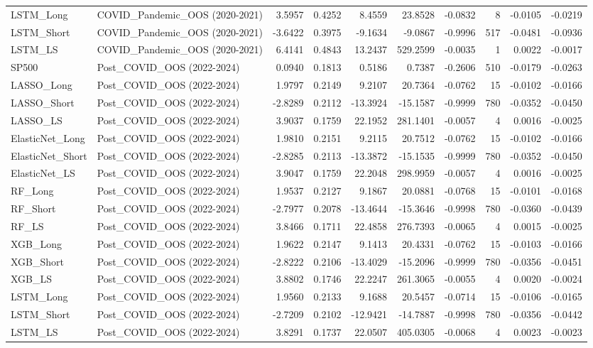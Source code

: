 \begin{tabular}{llrrrrrrrr}
\cline{1-10}
LSTM\_Long & COVID\_Pandemic\_OOS (2020-2021) & 3.5957 & 0.4252 & 8.4559 & 23.8528 & -0.0832 & 8 & -0.0105 & -0.0219 \\
\cline{1-10}
LSTM\_Short & COVID\_Pandemic\_OOS (2020-2021) & -3.6422 & 0.3975 & -9.1634 & -9.0867 & -0.9996 & 517 & -0.0481 & -0.0936 \\
\cline{1-10}
LSTM\_LS & COVID\_Pandemic\_OOS (2020-2021) & 6.4141 & 0.4843 & 13.2437 & 529.2599 & -0.0035 & 1 & 0.0022 & -0.0017 \\
\cline{1-10}
SP500 & Post\_COVID\_OOS (2022-2024) & 0.0940 & 0.1813 & 0.5186 & 0.7387 & -0.2606 & 510 & -0.0179 & -0.0263 \\
\cline{1-10}
LASSO\_Long & Post\_COVID\_OOS (2022-2024) & 1.9797 & 0.2149 & 9.2107 & 20.7364 & -0.0762 & 15 & -0.0102 & -0.0166 \\
\cline{1-10}
LASSO\_Short & Post\_COVID\_OOS (2022-2024) & -2.8289 & 0.2112 & -13.3924 & -15.1587 & -0.9999 & 780 & -0.0352 & -0.0450 \\
\cline{1-10}
LASSO\_LS & Post\_COVID\_OOS (2022-2024) & 3.9037 & 0.1759 & 22.1952 & 281.1401 & -0.0057 & 4 & 0.0016 & -0.0025 \\
\cline{1-10}
ElasticNet\_Long & Post\_COVID\_OOS (2022-2024) & 1.9810 & 0.2151 & 9.2115 & 20.7512 & -0.0762 & 15 & -0.0102 & -0.0166 \\
\cline{1-10}
ElasticNet\_Short & Post\_COVID\_OOS (2022-2024) & -2.8285 & 0.2113 & -13.3872 & -15.1535 & -0.9999 & 780 & -0.0352 & -0.0450 \\
\cline{1-10}
ElasticNet\_LS & Post\_COVID\_OOS (2022-2024) & 3.9047 & 0.1759 & 22.2048 & 298.9959 & -0.0057 & 4 & 0.0016 & -0.0025 \\
\cline{1-10}
RF\_Long & Post\_COVID\_OOS (2022-2024) & 1.9537 & 0.2127 & 9.1867 & 20.0881 & -0.0768 & 15 & -0.0101 & -0.0168 \\
\cline{1-10}
RF\_Short & Post\_COVID\_OOS (2022-2024) & -2.7977 & 0.2078 & -13.4644 & -15.3646 & -0.9998 & 780 & -0.0360 & -0.0439 \\
\cline{1-10}
RF\_LS & Post\_COVID\_OOS (2022-2024) & 3.8466 & 0.1711 & 22.4858 & 276.7393 & -0.0065 & 4 & 0.0015 & -0.0025 \\
\cline{1-10}
XGB\_Long & Post\_COVID\_OOS (2022-2024) & 1.9622 & 0.2147 & 9.1413 & 20.4331 & -0.0762 & 15 & -0.0103 & -0.0166 \\
\cline{1-10}
XGB\_Short & Post\_COVID\_OOS (2022-2024) & -2.8222 & 0.2106 & -13.4029 & -15.2096 & -0.9999 & 780 & -0.0356 & -0.0451 \\
\cline{1-10}
XGB\_LS & Post\_COVID\_OOS (2022-2024) & 3.8802 & 0.1746 & 22.2247 & 261.3065 & -0.0055 & 4 & 0.0020 & -0.0024 \\
\cline{1-10}
LSTM\_Long & Post\_COVID\_OOS (2022-2024) & 1.9560 & 0.2133 & 9.1688 & 20.5457 & -0.0714 & 15 & -0.0106 & -0.0165 \\
\cline{1-10}
LSTM\_Short & Post\_COVID\_OOS (2022-2024) & -2.7209 & 0.2102 & -12.9421 & -14.7887 & -0.9998 & 780 & -0.0356 & -0.0442 \\
\cline{1-10}
LSTM\_LS & Post\_COVID\_OOS (2022-2024) & 3.8291 & 0.1737 & 22.0507 & 405.0305 & -0.0068 & 4 & 0.0023 & -0.0023 \\
\cline{1-10}
\bottomrule
\end{tabular}
